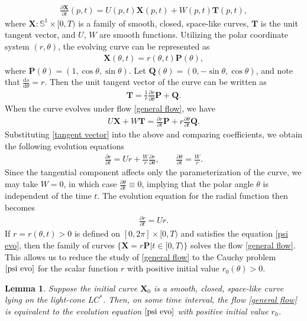 \documentclass[reqno,11pt, letterpaper]{amsart}
\theoremstyle{plain}
\newtheorem{lem}[thm]{Lemma}
\theoremstyle{definition}
\def\d{\mathrm d}
\def\Bbb#1{{\mathbb#1}}
\def\S{\Bbb S}
\numberwithin{equation}{section}
\begin{document}
\begin{align}\label{general flow}
	\frac{\partial \mathbf{X}}{\partial t}(p,t)=U(p,t)\mathbf{X}(p,t) +W(p,t)\mathbf{T}(p,t),
\end{align}
where $\mathbf{X}: \S^1\times[0,T)$ is a family of smooth, closed, space-like curves, $\mathbf{T}$ is the unit tangent vector, and $U$, $W$ are smooth functions.
Utilizing the polar coordinate system $(r,\theta)$, the evolving curve can be represented as
\begin{align}\label{evo cur}
	\mathbf{X}(\theta,t)=r(\theta,t)\mathbf{P}(\theta),
\end{align}
where $\mathbf{P}(\theta)=(1,\cos\theta,\sin\theta)$.
	 Let $\mathbf{Q}(\theta)=(0,-\sin\theta,\cos\theta)$, and note that $\frac{\d s}{\d\theta}=r$. Then the unit tangent vector of the curve can be written as
\begin{align}\label{tangent vector}
	\mathbf{T}=\frac{1}{ r}\frac{\partial r}{\partial\theta}\mathbf{P}+\mathbf{Q}.
\end{align}
When the curve evolves under flow \eqref{general flow}, we have
\begin{align*}
	U\mathbf{X}+W\mathbf{T}=\frac{\partial r}{\partial t}\mathbf{P}+ r \frac{\partial\theta}{\partial t}\mathbf{Q}.
\end{align*}
Substituting \eqref{tangent vector} into the above and comparing coefficients, we obtain the following evolution equations
\begin{align*}
	\frac{\partial r}{\partial t}=U r+\frac{W}{ r}\frac{\partial r}{\partial\theta}, \qquad	\frac{\partial\theta}{\partial t}=\frac{W}{ r}.
\end{align*}
Since the tangential component affects only the parameterization of the curve, we may take $W=0$,  in which case $\frac{\partial\theta}{\partial t}\equiv0$, implying that the polar angle $\theta$ is independent of the time $t$.
The evolution equation for the radial function then becomes
\begin{align}\label{psi evo}
	\frac{\partial r}{\partial t}=U r.
\end{align}
If $ r= r(\theta,t)>0$ is defined on $[0,2\pi]\times[0,T)$ and satisﬁes the equation \eqref{psi evo}, then the family of curves $\{\mathbf{X}= r\mathbf{P}\vert t\in[0,T)\}$ solves the flow \eqref{general flow}. This allows us to reduce the study of \eqref{general flow} to the Cauchy problem $\eqref{psi evo}$ for the scalar function $ r$ with positive initial value $ r_0(\theta)>0$. 
\begin{lem}\label{equi}
	Suppose the initial curve $\mathbf{X}_0$ is a smooth, closed, space-like curve lying on the light-cone $LC^*$. Then, on some time interval, the flow \eqref{general flow} is equivalent to the evolution equation $\eqref{psi evo}$ with positive initial value $ r_0$.
\end{lem}
\end{document}
